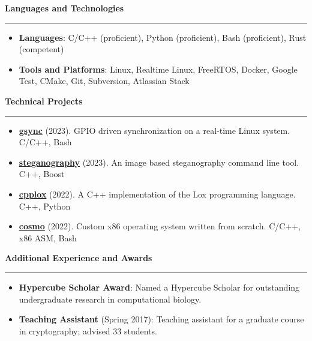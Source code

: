 \documentclass[12pt,letterpaper]{article}
\begin{document}
\medskip

\begin{large}
    \textbf{Languages and Technologies}
\end{large}

\smallskip \hrule \medskip

\begin{itemize}[topsep=0pt]
    \setlength\itemsep{0.2em}
    \item \textbf{Languages}: C/C++ (proficient),
                              Python (proficient),
                              Bash (proficient),
                              Rust (competent)
    \item \textbf{Tools and Platforms}: Linux,
                                        Realtime Linux,
                                        FreeRTOS,
                                        Docker,
                                        Google Test,
                                        CMake,
                                        Git,
                                        Subversion,
                                        Atlassian Stack
\end{itemize}

\medskip

\begin{large}
    \textbf{Technical Projects}
\end{large}

\smallskip \hrule \medskip

\begin{itemize}[topsep=0pt]
    \setlength\itemsep{0.2em}
    \item \textbf{\href{https://github.com/ivan-guerra/gsync.git}{gsync}}
        (2023). GPIO driven synchronization on a real-time Linux system. C/C++,
        Bash
    \item \textbf{\href{https://github.com/ivan-guerra/steganography.git}{steganography}}
        (2023). An image based steganography command line tool. C++, Boost
    \item \textbf{\href{https://github.com/ivan-guerra/cpplox.git}{cpplox}}
        (2022). A C++ implementation of the Lox programming language. C++,
        Python
    \item \textbf{
        \href{https://github.com/ivan-guerra/cosmo.git}{cosmo}}
        (2022). Custom x86 operating system written from scratch. C/C++, x86
        ASM, Bash
\end{itemize}

\medskip

\begin{large}
    \textbf{Additional Experience and Awards}
\end{large}

\smallskip \hrule \medskip

\begin{itemize}[topsep=0pt]
    \setlength\itemsep{0.2em}
    \item \textbf{Hypercube Scholar Award}: Named a Hypercube Scholar for
          outstanding undergraduate research in computational biology.
    \item \textbf{Teaching Assistant} (Spring 2017): Teaching assistant for a
          graduate course in cryptography; advised 33 students.
\end{itemize}
\end{document}
